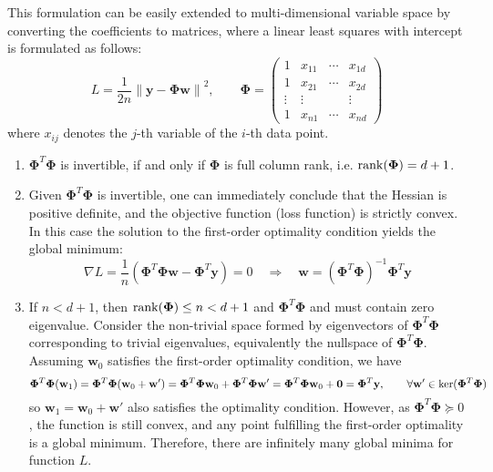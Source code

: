 \documentclass[a4paper, 10pt]{article}
\begin{document}
This formulation can be easily extended to multi-dimensional variable space by converting the coefficients to matrices, where a linear least squares with intercept is formulated as follows:
\begin{equation}
    L = \frac{1}{2n}\left\| \mathbf{y} - \bm{\Phi} \mathbf{w} \right\|^2,\qquad \bm{\Phi} = 
    \begin{pmatrix}
        1 & x_{11} & \cdots & x_{1d} \\ 
        1 & x_{21} & \cdots & x_{2d} \\ 
        \vdots & \vdots & & \vdots \\
        1 & x_{n1} & \cdots & x_{nd}
    \end{pmatrix}
\end{equation}
where $x_{ij}$ denotes the $j$-th variable of the $i$-th data point.
\begin{enumerate}[resume*]
    \item $\bm{\Phi}^T\bm{\Phi}$ is invertible, if and only if $\bm{\Phi}$ is full column rank, i.e. ${\rm rank}(\bm{\Phi}) = d+1$.
    
    \item Given $\bm{\Phi}^T \bm{\Phi}$ is invertible, one can immediately conclude that the Hessian is positive definite, and the objective function (loss function) is strictly convex. In this case the solution to the first-order optimality condition yields the global minimum:
    \begin{equation}
        \nabla L = \frac{1}{n}\left(\bm{\Phi}^T \bm{\Phi} \mathbf{w} - \bm{\Phi}^T \mathbf{y}\right) = 0\quad \Longrightarrow\quad \mathbf{w} = \left(\bm{\Phi}^T \bm{\Phi}\right)^{-1}\bm{\Phi}^T \mathbf{y}
    \end{equation}
    
    \item If $n < d+1$, then ${\rm rank}(\bm{\Phi}) \leq n < d+1$ and $\bm{\Phi}^T \bm{\Phi}$ and must contain zero eigenvalue. Consider the non-trivial space formed by eigenvectors of $\bm{\Phi}^T \bm{\Phi}$ corresponding to trivial eigenvalues, equivalently the nullspace of $\bm{\Phi}^T \bm{\Phi}$. Assuming $\mathbf{w}_0$ satisfies the first-order optimality condition, we have
    \begin{equation}
        \bm{\Phi}^T \bm{\Phi}(\mathbf{w}_1) = \bm{\Phi}^T \bm{\Phi}(\mathbf{w}_0 + \mathbf{w}') = \bm{\Phi}^T \bm{\Phi} \mathbf{w}_0 + \bm{\Phi}^T \bm{\Phi} \mathbf{w}' = \bm{\Phi}^T \bm{\Phi} \mathbf{w}_0 + \mathbf{0} = \bm{\Phi}^T \mathbf{y},\qquad \forall \mathbf{w}' \in {\rm ker}(\bm{\Phi}^T \bm{\Phi})
    \end{equation}
    so $\mathbf{w}_1 = \mathbf{w}_0 + \mathbf{w}'$ also satisfies the optimality condition. However, as $\bm{\Phi}^T \bm{\Phi} \succeq 0$, the function is still convex, and any point fulfilling the first-order optimality is a global minimum. Therefore, there are infinitely many global minima for function $L$.
    
\end{enumerate}
\end{document}
